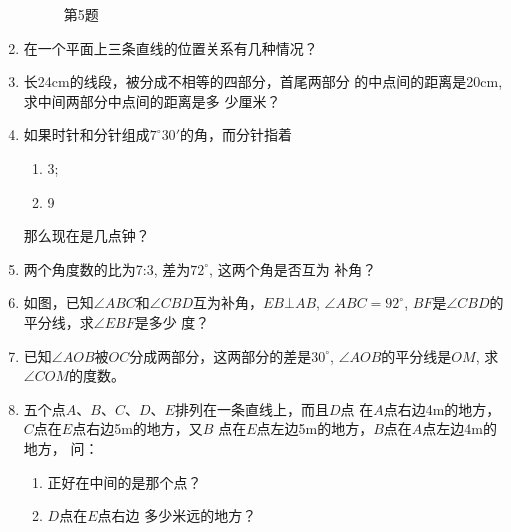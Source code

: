 \begin{enumerate}
\begin{figure}[htp]
\begin{minipage}[t]{0.48\textwidth}
\begin{tikzpicture}[>=latex, scale=1]
	\end{tikzpicture}
	\caption*{第5题}
	\end{minipage}
	\end{figure}

\item 在一个平面上三条直线的位置关系有几种情况？
\item 长24cm的线段，被分成不相等的四部分，首尾两部分
的中点间的距离是20cm, 求中间两部分中点间的距离是多
少厘米？
\item 如果时针和分针组成$7^{\circ}30'$的角，而分针指着
\begin{multicols}{2}
	\begin{enumerate}
		\item 3;
		\item 9
	\end{enumerate}
\end{multicols}
那么现在是几点钟？
\item 两个角度数的比为7:3, 差为$72^{\circ}$, 这两个角是否互为
补角？
\item 如图，已知$\angle ABC$和$\angle CBD$互为补角，$EB\bot AB$, $\angle ABC=92^{\circ}$, $BF$是$\angle CBD$的平分线，求$\angle EBF$是多少
度？
\item 已知$\angle AOB$被$OC$分成两部分，这两部分的差是$30^{\circ}$, 
$\angle AOB$的平分线是$OM$, 求$\angle COM$的度数。
\item 五个点$A$、$B$、$C$、$D$、$E$排列在一条直线上，而且$D$点
在$A$点右边4m的地方，$C$点在$E$点右边5m的地方，又$B$
点在$E$点左边5m的地方，$B$点在$A$点左边4m的地方，
问：
\begin{enumerate}
	\item 正好在中间的是那个点？
	\item $D$点在$E$点右边
多少米远的地方？
\end{enumerate}


\end{enumerate}
